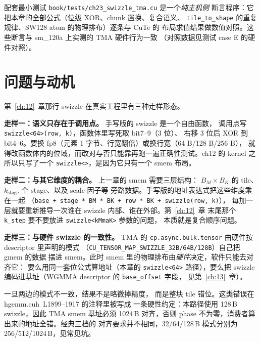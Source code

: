 配套最小测试 \texttt{book/\allowbreak{}tests/\allowbreak{}ch23\_\allowbreak{}swizzle\_\allowbreak{}tma.cu} 是一个\emph{纯主机侧}
断言程序：它把本章的全部公式（位级 XOR、chunk 置换、复合语义、
\texttt{tile\_\allowbreak{}to\_\allowbreak{}shape} 的重复规律、SW128 atom 的物理排布）逐条与 CuTe 的
布局求值结果做数值对照。这些断言与 sm\_120a 上实测的 TMA 硬件行为一致
（对照数据见测试 case E 的硬件对照）。

\section{问题与动机}

第~\ref{ch:12}~章那行 swizzle 在真实工程里有三种走样形态。

\textbf{走样一：语义只存在于调用点。} 手写版的 swizzle 是一个自由函数，
调用点写 \texttt{swizzle\allowbreak{}<64>\allowbreak{}(row,\allowbreak{} k)}，函数体里写死取 bit7--9（3 位）、
右移 3 位后 XOR 到 bit4--6。要换 fp8（元素 1 字节、行宽翻倍）或换行宽（64 B/128 B/256 B），
就得改函数体内的位域，而改对与否只能靠再跑一遍正确性测试。ch12 的 kernel
之所以只写了一个 \texttt{swizzle<>}，是因为它只有一个 smem 布局。

\textbf{走样二：与其它维度的耦合。} 上一章的 smem 需要三层结构：
$B_M\times B_K$ 的 tile、$k_{\text{stage}}$ 个 stage、以及 scale 因子等
旁路数据。手写版的地址表达式把这些维度乘在一起
（\texttt{base + stage * BM * BK + row * BK + swizzle\allowbreak{}(row,\allowbreak{} k)}），
每加一层就要重新推导一次谁在 swizzle 内部、谁在外部。第~\ref{ch:12}~章
末尾那个 \texttt{k\_step} 要不要放进 \texttt{swizzle\allowbreak{}<k\allowbreak{}Mma\allowbreak{}K>} 参数的问题，
本质就是复合顺序问题。

\textbf{走样三：与硬件 swizzle 的一致性。} TMA 的
\texttt{cp.\allowbreak{}async.\allowbreak{}bulk.\allowbreak{}tensor} 由硬件按 descriptor 里声明的模式
（\texttt{CU\_\allowbreak{}TENSOR\_\allowbreak{}MAP\_\allowbreak{}SWIZZLE\_\allowbreak{}32B/\allowbreak{}64B/\allowbreak{}128B}）自己把 gmem 的数据
摆进 smem。此时 smem 里的物理排布由\emph{硬件}决定，软件只能去对齐它：
要么用同一套位公式算地址（本章的 \texttt{swizzle<64>} 路径），要么把
swizzle 编码进基址（WGMMA descriptor 的 \texttt{base\_offset} 字段，
见第~\ref{ch:13}~章）。

一旦两边的模式不一致，结果不是略微掉精度，
而是整块 tile 错位。这类错误在 hgemm.cuh~L1899--1917 的注释里被写成
一条硬性约定：本路径使用 128\,B swizzle，因此 TMA smem 基址必须
1024\,B 对齐，否则 phase 不为零，消费者算出来的地址全错。经典三档的
对齐要求并不相同，32/64/128\,B 模式分别为 256/512/1024\,B，见常见坑。

